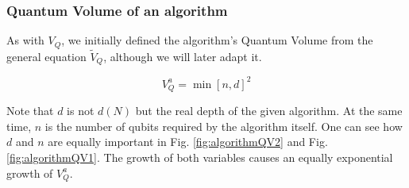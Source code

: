 \documentclass[11pt]{article}
\begin{document}
\subsubsection{Quantum Volume of an algorithm}
\label{sec:orgc2c3ccb}

As with \(V_Q\), we initially defined the algorithm's Quantum Volume from the general equation \(\tilde{V}_Q\), although we will later adapt it.

$$V_Q^a = \min \left[ n,d \right]^2$$

Note that \(d\) is not \(d(N)\) but the real depth of the given algorithm.
At the same time, \(n\) is the number of qubits required by the algorithm itself.
One can see how \(d\) and \(n\) are equally important in Fig. \ref{fig:algorithmQV2} and Fig. \ref{fig:algorithmQV1}.
The growth of both variables causes an equally exponential growth of \(V^a_Q\).

\end{document}
